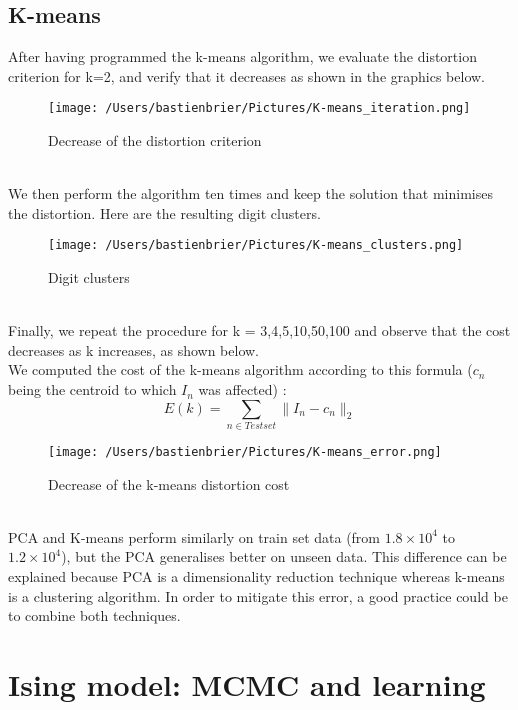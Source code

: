\documentclass[11pt, oneside]{article}   	%
\begin{document}
	\subsection{K-means}
		After having programmed the k-means algorithm, we evaluate the distortion criterion for k=2, and verify that it decreases as shown in the graphics below.
		\begin{figure}[h]
			\centering
			\caption{Decrease of the distortion criterion \label{K-means}}
			\texttt{[image: /Users/bastienbrier/Pictures/K-means\_iteration.png]}
		\end{figure}
		\\We then perform the algorithm ten times and keep the solution that minimises the distortion. Here are the resulting digit clusters.
		\begin{figure}[h]
			\centering
			\caption{Digit clusters \label{K-means}}
			\texttt{[image: /Users/bastienbrier/Pictures/K-means\_clusters.png]}
		\end{figure}
		\\ Finally, we repeat the procedure for k = 3,4,5,10,50,100 and observe that the cost	decreases as k increases, as shown below.
		\\ We computed the cost of the k-means algorithm according to this formula ($c_n$ being the centroid to which $I_n$ was affected) :
		\[E(k)=\sum_{n\in Testset}\|I_n-c_n\|_2\]
		\begin{figure}[h]
			\centering
			\caption{Decrease of the k-means distortion cost \label{K-means}}
			\texttt{[image: /Users/bastienbrier/Pictures/K-means\_error.png]}
		\end{figure}
		\\ PCA and K-means perform similarly on train set data (from $1.8\times10^4$ to $1.2\times10^4$), but the PCA generalises better on unseen data. This difference can be 		explained because PCA is a dimensionality reduction technique whereas k-means is a clustering algorithm. In order to mitigate this error, a good practice could be to 			combine both techniques.
		
\vspace{4pt}	
\section{Ising model: MCMC and learning}
\vspace{4pt}
	
\end{document}
